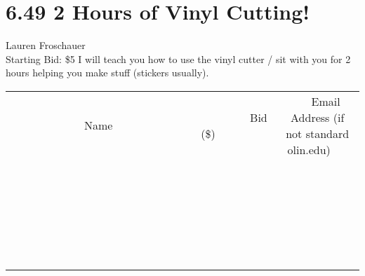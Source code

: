 \documentclass[11pt]{article}
\begin{document}
\section*{6.49 2 Hours of Vinyl Cutting!}
Lauren Froschauer
\\
Starting Bid: \$5
\newline
I will teach you how to use the vinyl cutter / sit with you for 2 hours helping you make stuff (stickers usually).
\\[6ex]
\begin{tabular}{c c c}
~~~~~~~~~~~~~Name~~~~~~~~~~~~~ & ~~~~~~~~~Bid (\$)~~~~~~~~~  & ~~~Email Address (if not standard olin.edu)~~~\\
 & & \\
\hline
 & & \\
\hline
 & & \\
\hline
 & & \\
\hline
 & & \\
\hline
 & & \\
\hline
 & & \\
\hline
 & & \\
\hline
 & & \\
\hline
 & & \\
\hline
 & & \\
\hline
 & & \\
\hline
 & & \\
\hline
 & & \\
\hline
 & & \\
\hline
 & & \\
\hline
 & & \\
\hline
 & & \\
\hline
 & & \\
\hline
 & & \\
\hline
 & & \\
\hline
 & & \\
\hline
 & & \\
\hline
 & & \\
\hline
 & & \\
\hline
 & & \\
\hline
\end{tabular}
\newpage
\end{document}
